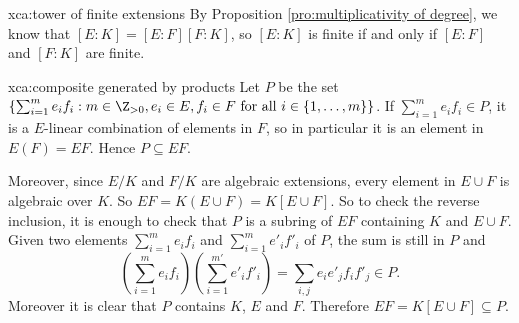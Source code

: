\begin{sol}{xca:tower of finite extensions}
By Proposition \ref{pro:multiplicativity of degree},
we know that $[E:K]=[E:F][F:K]$, so 
$[E:K]$ is finite if and only if $[E:F]$ and $[F:K]$ are finite.
\end{sol}

\begin{sol}{xca:composite generated by products}
Let $P$ be the set 
$\left\{\sum_{i=1}^me_if_i:m\in\Z_{>0},e_i\in E,f_i\in F\text{ for all $i\in\{1,\dots,m\}$}\right\}$.
If $\sum_{i=1}^me_if_i\in P$, it is a $E$-linear combination
of elements in $F$, so in particular it is an element
in $E(F)=EF$. Hence $P\subseteq EF$.

Moreover, since $E/K$ and $F/K$ are algebraic extensions,
every element in $E\cup F$ is algebraic over $K$.
So $EF=K(E\cup F)=K[E\cup F]$.
So to check the reverse inclusion, 
it is enough to check
that $P$ is a subring of $EF$ containing 
$K$ and $E\cup F$. 
Given two elements 
$\sum_{i=1}^me_if_i$ and $\sum_{i=1}^me'_if'_i$ of $P$, the sum is still in $P$ and 
\[
\left(\sum_{i=1}^me_if_i\right)\left(\sum_{i=1}^{m'}e'_if'_i\right)
=\sum_{i,j}e_ie'_jf_if'_j\in P.
\]
Moreover it is clear that $P$ contains $K$, $E$ and $F$.
Therefore $EF=K[E\cup F]\subseteq P$.
\end{sol}

